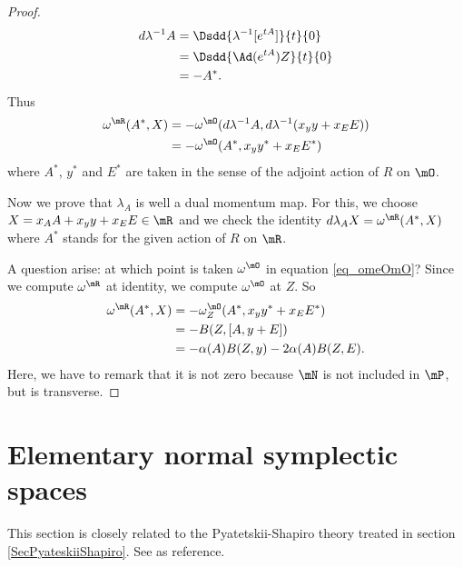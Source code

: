 \begin{proof}
\[\begin{split}
d\lambda^{-1}A&=\Dsdd{ \lambda^{-1}[ e^{tA}] }{t}{0}\\
		&=\Dsdd{ \Ad( e^{tA})Z }{t}{0}\\
		&=-A^*.
\end{split}  
\]
Thus 
\begin{equation} \label{eq_omeOmO}
\begin{split}
\omega^{\mR}(A^*,X)&=-\omega^{\mO}(d\lambda^{-1}A,d\lambda^{-1}(x_yy+x_EE))\\
		&=-\omega^{\mO}(A^*,x_yy^*+x_EE^*)
\end{split}  
\end{equation}
where $A^*$, $y^*$ and $E^*$ are taken in the sense of the adjoint action of $R$ on $\mO$.

Now we prove that $\lambda_A$ is well a dual momentum map. For this, we choose $X=x_AA+x_yy+x_EE\in\mR$ and we check the identity $d\lambda_AX=\omega^{\mR}(A^*,X)$ where $A^*$ stands for the given action of $R$ on $\mR$.

A question arise: at which point is taken $\omega^{\mO}$ in equation \eqref{eq_omeOmO}? Since we compute $\omega^{\mR}$ at identity, we compute $\omega^{\mO}$ at $Z$. So
 \[ 
\begin{split}
  \omega^{\mR}(A^*,X)&=-\omega^{\mO}_Z(A^*,x_yy^*+x_EE^*)\\
		&=-B(Z,[A,y+E])\\
		&=-\alpha(A)B(Z,y)-2\alpha(A)B(Z,E).
\end{split}  
\]
Here, we have to remark that it is not zero because $\mN$ is not included in $\mP$, but is transverse.

\end{proof}
\section{Elementary normal symplectic spaces}
\label{SecElemNormSymplSpace}

This section is closely related to the Pyatetskii-Shapiro theory treated in section \ref{SecPyateskiiShapiro}. See \cite{QuantifKhalerian} as reference.

